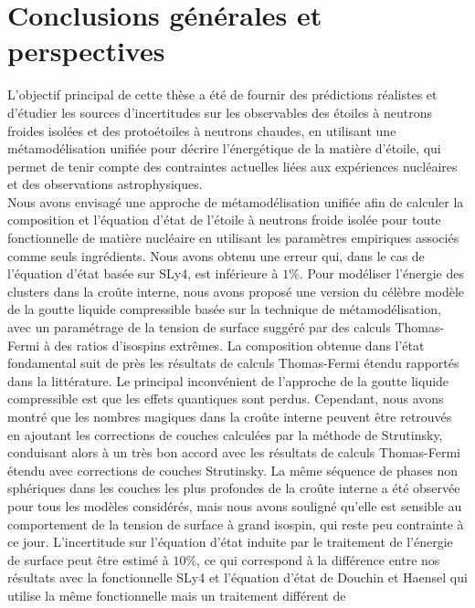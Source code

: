 \section{Conclusions générales et perspectives}

L'objectif principal de cette thèse a été de fournir des prédictions réalistes 
et d'étudier les sources d'incertitudes sur les observables des étoiles à 
neutrons froides isolées et des protoétoiles à neutrons chaudes, en utilisant 
une métamodélisation unifiée pour décrire l'énergétique de la matière d'étoile, 
qui permet de tenir compte des contraintes actuelles liées aux expériences 
nucléaires et des observations astrophysiques.
\\

Nous avons envisagé une approche de métamodélisation unifiée afin de 
calculer la composition et l'équation d'état de l'étoile à neutrons froide
isolée pour toute fonctionnelle de matière nucléaire en utilisant les 
paramètres empiriques associés comme seuls ingrédients. Nous avons obtenu une
erreur qui, dans le cas de l'équation d'état basée sur SLy4, est inférieure à 
$1\%$. 
Pour modéliser l'énergie des clusters dans la croûte interne, nous avons 
proposé une version du célèbre modèle de la goutte liquide compressible basée 
sur la technique de métamodélisation, avec un paramétrage de la tension de 
surface suggéré par des calculs Thomas-Fermi à des ratios d'isospins extrêmes. 
%
La composition obtenue dans l'état fondamental suit de près les résultats de 
calculs Thomas-Fermi étendu rapportés dans la littérature. Le principal 
inconvénient de l'approche de la goutte liquide compressible est que les effets 
quantiques sont perdus. Cependant, nous avons montré que les nombres magiques 
dans la croûte interne peuvent être retrouvés en ajoutant les corrections de 
couches calculées par la méthode de Strutinsky, conduisant alors à un très bon 
accord avec les résultats de calculs Thomas-Fermi étendu avec corrections de
couches Strutinsky. 
%
La même séquence de phases non sphériques dans les couches les plus profondes 
de la croûte interne a été observée pour tous les modèles considérés, mais nous 
avons souligné qu'elle est sensible au comportement de la tension de surface à 
grand isospin, qui reste peu contrainte à ce jour. 
%
L'incertitude sur l'équation d'état induite par le traitement de l'énergie de 
surface peut être estimé à $10\%$, ce qui correspond à la différence entre 
nos résultats avec la fonctionnelle SLy4 et l'équation d'état de Douchin et
Haensel qui utilise la même fonctionnelle mais un traitement différent de 
